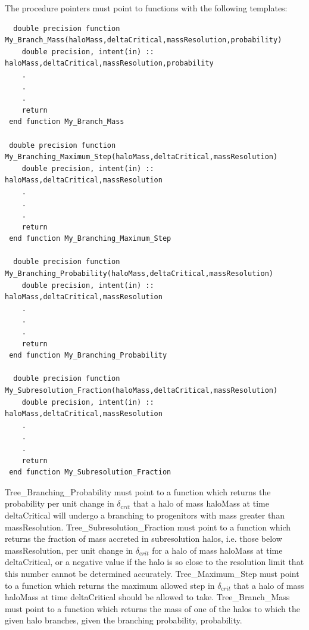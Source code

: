 The procedure pointers must point to functions with the following templates:
\begin{verbatim}
  double precision function My_Branch_Mass(haloMass,deltaCritical,massResolution,probability)
    double precision, intent(in) :: haloMass,deltaCritical,massResolution,probability
    .
    .
    .
    return
 end function My_Branch_Mass

 double precision function My_Branching_Maximum_Step(haloMass,deltaCritical,massResolution)
    double precision, intent(in) :: haloMass,deltaCritical,massResolution
    .
    .
    .
    return
 end function My_Branching_Maximum_Step

  double precision function My_Branching_Probability(haloMass,deltaCritical,massResolution)
    double precision, intent(in) :: haloMass,deltaCritical,massResolution
    .
    .
    .
    return
 end function My_Branching_Probability

  double precision function My_Subresolution_Fraction(haloMass,deltaCritical,massResolution)
    double precision, intent(in) :: haloMass,deltaCritical,massResolution
    .
    .
    .
    return
 end function My_Subresolution_Fraction
\end{verbatim}
{\normalfont \ttfamily Tree\_Branching\_Probability} must point to a function which returns the probability per unit change in $\delta_{\mathrm crit}$ that a halo of mass {\normalfont \ttfamily haloMass} at time {\normalfont \ttfamily deltaCritical} will undergo a branching to progenitors with mass greater than {\normalfont \ttfamily massResolution}. {\normalfont \ttfamily Tree\_Subresolution\_Fraction} must point to a function which returns the fraction of mass accreted in subresolution halos, i.e. those below {\normalfont \ttfamily massResolution}, per unit change in $\delta_{\mathrm crit}$ for a halo of mass {\normalfont \ttfamily haloMass} at time {\normalfont \ttfamily deltaCritical}, or a negative value if the halo is so close to the resolution limit that this number cannot be determined accurately. {\normalfont \ttfamily Tree\_Maximum\_Step} must point to a function which returns the maximum allowed step in $\delta_{\mathrm crit}$ that a halo of mass {\normalfont \ttfamily haloMass} at time {\normalfont \ttfamily deltaCritical} should be allowed to take. {\normalfont \ttfamily Tree\_Branch\_Mass} must point to a function which returns the mass of one of the halos to which the given halo branches, given the branching 
probability, {\normalfont \ttfamily probability}.

